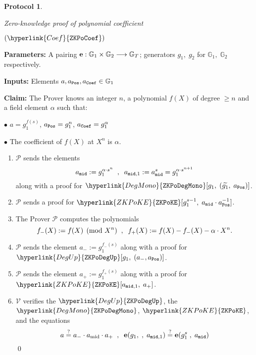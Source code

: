 \documentclass[11pt, lettersize, notitlepage, leqno, footskip=0.6cm]{article}
\newcommand{\lra}{\longrightarrow}
\newcommand{\wti}{\widetilde}
\newcommand{\mc}{\mathcal}
\newcommand{\mb}{\mathbb}
\newcommand{\mbf}{\mathbf}
\newcommand{\mr}{\mathrm}
\newcommand{\al}{\alpha}
\newcommand{\mP}{\mc{P}}
\newcommand{\V}{\mc{V}}
\newcommand{\vs}{\vspace{-0.15cm}}
\newcommand{\noin}{\noindent}
\newcommand{\sta}{\stackrel{?}{=}}
\newcommand{\e}{\mbf{e}}
\newtheorem{Prot}[Thm]{Protocol}
\numberwithin{equation}{section}
\begin{document}
\begin{mdframed}
\begin{Prot} \hypertarget{Coef}{Zero-knowledge proof of polynomial coefficient} $(\hyperlink{Coef}{\tt{ZKPoCoef}})$\end{Prot}  

\noindent \textbf{Parameters:} A pairing ${\bf{e}}:\mb{G}_1\times \mb{G}_2\lra \mb{G}_T$; generators $g_1,\;g_2$ for $\mb{G}_1,\; \mb{G}_2$ respectively.


\noindent \textbf{Inputs:} Elements $a, a_{\tt{Pos}}, a_{\tt{Coef}} \in \mb{G}_1$

\noindent \textbf{Claim:} The Prover knows an integer $n$, a polynomial $f(X)$ of degree $\geq n$ and a field element $\al$ such that: \vspace{2mm}

\noin $\bullet$ $a = g_1^{f(s)}$, $a_{\tt{Pos}} = g_1^n$, $a_{\tt{Coef}} = g_1^{\al}$ \vspace{1mm}

\noin $\bullet$ The coefficient of $f(X)$ at $X^n$ is $\al$.


\begin{enumerate}[wide, labelwidth=!, labelindent=0pt, itemsep=-0.2ex] 

\item $\mP$ sends the elements \vs $$a_{\tt{mid}}:= g_1^{\al\cdot s^n}\;\;,\;\;a_{{\tt{mid}},1}:= a_{\tt{mid}}^s = g_1^{\al\cdot s^{n+1}}  $$ along with a proof for $\hyperlink{DegMono}{\tt{ZKPoDegMono}}[g_1,\;(\wti{g_1},\; a_{\tt{Pos}})]$.

\item $\mP$ sends a proof for $\hyperlink{ZKPoKE}{\tt{ZKPoKE}}[g_1^{s-1},\; a_{\tt{mid}}\cdot a_{\tt{Pos}}^{-1}]$.

\item The Prover $\mP$ computes the polynomials \vs $$f_{-}(X):= f(X)\pmod{X^n}\;\;,\;\;f_{+}(X):= {f(X)-f_{-}(X) - \al\cdot X^n}. \vs $$ 

\item $\mP$ sends the element $a_{-}:= g_1^{f_{-}(s)}$ along with a proof for $\hyperlink{DegUp}{\tt{ZKPoDegUp}}[g_1,\;(a_{-}, a_{\tt{Pos}})]$.

\item $\mP$ sends the element $a_{+}:= g_1^{f_{+}(s)}$ along with a proof for $\hyperlink{ZKPoKE}{\tt{ZKPoKE}}[a_{{\tt{mid}},1},\; a_{+}]$. 



\item $\V$ verifies the $\hyperlink{DegUp}{\tt{ZKPoDegUp}}$, the $\hyperlink{DegMono}{\tt{ZKPoDegMono}}$, $\hyperlink{ZKPoKE}{\tt{ZKPoKE}}$, 
and the equations \vs $$ a\sta a_{-}\cdot a_{\mr{mid}}\cdot a_{+}\;\;,\;\;\e(g_1,\;,\;a_{{\tt{mid}},1})\sta \e(g_1^{s}\;,\;a_{\tt{mid}}) \vspace{-7mm}  $$ \qed \end{enumerate} 
\end{mdframed}
\end{document}
